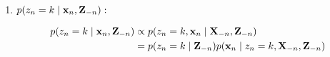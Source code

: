 \begin{enumerate}
       \\
   
    
    
    
   \newpage
   \item 
 
    \underline{$p(z_n = k \mid \bold{x}_n, \mathbf{Z}_{-n}):$} 
    
    \begin{align*}
        p(z_n = k \mid \bold{x}_n, \mathbf{Z}_{-n}) &\propto p(z_n = k, \bold{x}_n \mid \mathbf{X}_{-n}, \mathbf{Z}_{-n})
        \\
        &= p(z_n = k \mid \mathbf{Z}_{-n}) p(\bold{x}_n \mid z_n = k, \mathbf{X}_{-n}, \mathbf{Z}_{-n})
    \end{align*}
    

\end{enumerate}

